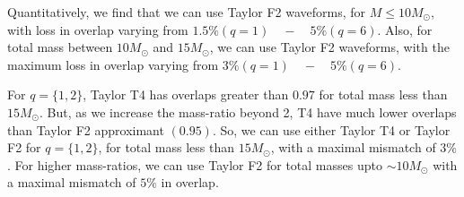 \documentclass[aps,
prd,
amsmath,
amssymb,
twocolumn,
floatfix,
groupedaddress]{revtex4-1}
\def\l({\left(}
\def\r){\right)}
\begin{document}
 

Quantitatively, we find that we can use Taylor F2 waveforms, for $M\leq 10M_{\odot}$, with loss in overlap varying from $1.5\%\l(q=1\r)\quad-\quad5\%\l(q=6\r)$. Also, for total mass between $10M_{\odot}$ and $15M_{\odot}$, we can use Taylor F2 waveforms, with the maximum loss in overlap varying from $3\%\l(q=1\r)\quad-\quad5\%\l(q=6\r)$. 

For $q=\{1,2\}$, Taylor T4 has overlaps greater than $0.97$ for total mass less than $15M_{\odot}$. But, as we increase the mass-ratio beyond 2, T4 have much lower overlaps than Taylor F2 approximant $\l(0.95\r)$. So, we can use either Taylor T4 or Taylor F2 for $q=\{1,2\}$, for total mass less than $15M_{\odot}$, with a maximal mismatch of $3\%$. For higher mass-ratios, we can use Taylor F2 for total masses upto $\sim 10M_{\odot}$ with a maximal mismatch of $5\%$ in overlap.
\end{document}
